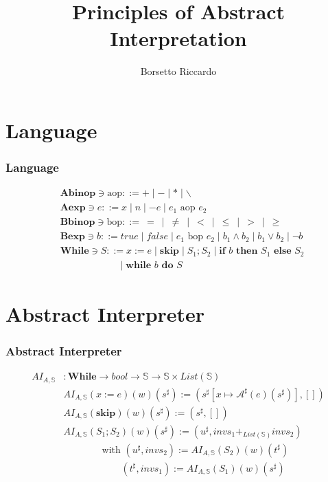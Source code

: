 \documentclass{beamer}
\title{Principles of Abstract Interpretation}
\author{Borsetto Riccardo}
\institute{Università degli studi di Verona}
\begin{document}
\frame{\titlepage}


\section{Language}

\begin{frame}
    \frametitle{Language}
        \begin{align*}
        &\mathbf { Abinop } \ni \text{aop}::= + \mid - \mid * \mid \backslash  \\
        &\mathbf { Aexp } \ni e::= x \mid n \mid -e \mid e_1 \text { aop } e_2 \\
        &\mathbf { Bbinop } \ni \text{bop}::= \ =\ \mid\ \ne\ \mid\ <\ \mid\ \le\ \mid\ > \ \mid\ \ge\\
        & \mathbf { Bexp } \ni b::=  true  \mid false \mid e_1 \text{ bop } e_2 \mid b_1 \wedge b_2 \mid b_1 \vee b_2 \mid \neg b \\
        & \mathbf { While } \ni S::= x:=e \mid \textbf {skip} \mid S_1 ; S_2 \mid \textbf {if } b \textbf { then } S_1 \textbf { else } S_2\\
         &\qquad \qquad \qquad \mid \textbf {while } b \textbf { do } S
        \end{align*}
\end{frame}

\section{Abstract Interpreter}

\begin{frame}
    \frametitle{Abstract Interpreter}
\begin{align*}
AI_{A, \mathbb{S}}&: \mathbf { While } \to bool \rightarrow \mathbb{S} \rightarrow \mathbb{S} \times List(\mathbb{S}) \\
&AI_{A, \mathbb{S}} (x:=e) (w) (s^{\sharp}) := (s^{\sharp}[x \mapsto \mathcal{A}^{\sharp} (e) (s^{\sharp})], []) \\
&AI_{A, \mathbb{S}} (\textbf{skip}) (w) (s^{\sharp}) := (s^{\sharp}, []) \\
&AI_{A, \mathbb{S}} (S_1 ; S_2) (w) (s^{\sharp}) := (u^{\sharp}, invs_1 +_{List(\mathbb{S})} invs_2) \\
& \qquad \qquad \text{with } (u^{\sharp}, invs_2) := AI_{A, \mathbb{S}} (S_2) (w) (t^{\sharp}) \\
& \qquad \qquad \qquad (t^{\sharp}, invs_1) := AI_{A, \mathbb{S}} (S_1) (w) (s^{\sharp})
\end{align*}
\end{frame}
\end{document}
